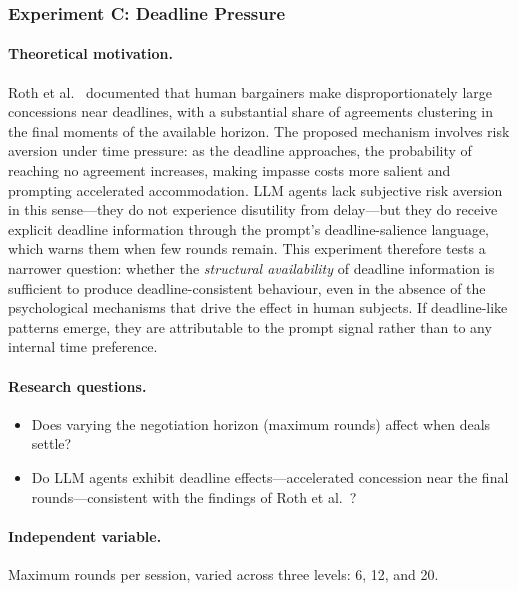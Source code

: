 \subsubsection{Experiment C: Deadline Pressure}
\label{sec:exp-deadline}

\paragraph{Theoretical motivation.}
Roth et al.~\cite{roth1988deadline} documented that human bargainers make disproportionately large concessions near deadlines, with a substantial share of agreements clustering in the final moments of the available horizon.  The proposed mechanism involves risk aversion under time pressure: as the deadline approaches, the probability of reaching no agreement increases, making impasse costs more salient and prompting accelerated accommodation.  LLM agents lack subjective risk aversion in this sense---they do not experience disutility from delay---but they do receive explicit deadline information through the prompt's deadline-salience language, which warns them when few rounds remain.  This experiment therefore tests a narrower question: whether the \emph{structural availability} of deadline information is sufficient to produce deadline-consistent behaviour, even in the absence of the psychological mechanisms that drive the effect in human subjects.  If deadline-like patterns emerge, they are attributable to the prompt signal rather than to any internal time preference.

\paragraph{Research questions.}
\begin{itemize}
    \item[\textbf{RQ-C1.}] Does varying the negotiation horizon (maximum rounds) affect when deals settle?
    \item[\textbf{RQ-C2.}] Do LLM agents exhibit deadline effects---accelerated concession near the final rounds---consistent with the findings of Roth et al.~\cite{roth1988deadline}?
\end{itemize}

\paragraph{Independent variable.}
Maximum rounds per session, varied across three levels: 6, 12, and 20.

